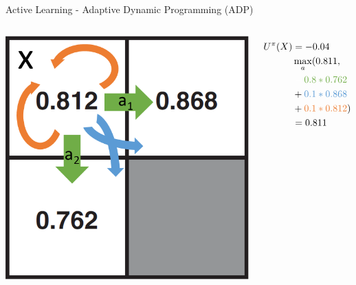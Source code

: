 \begin{frame}[c]{Active Learning - Adaptive Dynamic Programming (ADP)}
\begin{columns}
	\begin{center}
		\includegraphics[width=\linewidth]{img-elias/ADP_example_active.png}
	\end{center}
	\begin{align*}
	U^{\pi}(X)&=-0.04\\
	&\max_{a}(0.811,\\
	&\color{white}+\color{PPgreen}0.8*0.762\\
	&+\color{PPblue}0.1*0.868\\
	&+\color{PPorange}0.1*0.812\color{black})\\
	&=0.811
	\end{align*}
\end{columns}
\end{frame}


